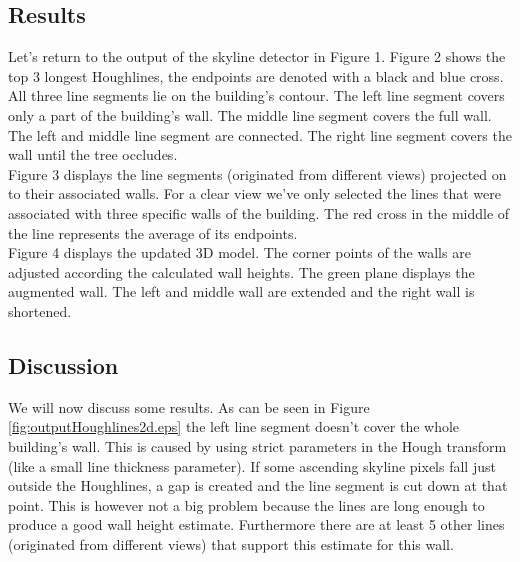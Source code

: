 \documentclass[10pt]{article}
\begin{document}
{\subsection{Results}
\noindent
{}
Let's return to the output of the skyline detector in Figure 1.
Figure 2
shows the top 3 longest Houghlines, the
endpoints are denoted with a black and blue cross. All three line segments lie on the
building's contour.  The left line segment covers only a part of the building's wall. The
middle line segment covers the full wall. The left and middle line segment are connected. The
right line segment covers the wall until the tree occludes.\\

Figure %
3 displays the line segments (originated from
different views) projected on to their associated walls.  For a clear view we've
only selected the lines that were associated with three specific walls of the building.  
The red cross in the middle of the line represents the average of its endpoints.\\

Figure 4 %
displays the updated 3D model. The
corner points of the walls are adjusted according the calculated wall heights.
The green plane displays the augmented wall. The left and middle wall are extended
and the right wall is shortened.\\


\subsection{Discussion}
We will now discuss some results. As can be seen in Figure
\ref{fig:outputHoughlines2d.eps} the left line segment doesn't cover the whole
building's wall. This is caused by using strict parameters in the Hough transform
(like a small line thickness parameter).  If some ascending skyline pixels fall just outside
the Houghlines, a gap is created and the line segment is cut down at that point.
This is however not a big problem because the lines are long enough to produce a
good wall height estimate. Furthermore there are at least 5 other lines
(originated from different views) that support this estimate for this wall.\\



}
\end{document}
